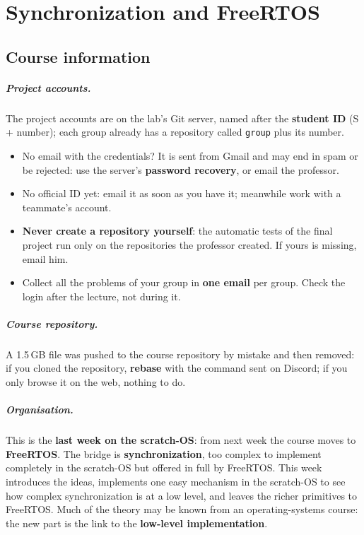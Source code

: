 \chapter{Synchronization and FreeRTOS}

\section{Course information}
\paragraph{Project accounts.} The project accounts are on the lab's Git server, named after the \textbf{student ID} (S + number); each group already has a repository called \texttt{group} plus its number.
\begin{itemize}
    \item No email with the credentials? It is sent from Gmail and may end in spam or be rejected: use the server's \textbf{password recovery}, or email the professor.
    \item No official ID yet: email it as soon as you have it; meanwhile work with a teammate's account.
    \item \textbf{Never create a repository yourself}: the automatic tests of the final project run only on the repositories the professor created. If yours is missing, email him.
    \item Collect all the problems of your group in \textbf{one email} per group. Check the login after the lecture, not during it.
\end{itemize}
\paragraph{Course repository.} A 1.5\,GB file was pushed to the course repository by mistake and then removed: if you cloned the repository, \textbf{rebase} with the command sent on Discord; if you only browse it on the web, nothing to do.

\paragraph{Organisation.} This is the \textbf{last week on the scratch-OS}: from next week the course moves to \textbf{FreeRTOS}. The bridge is \textbf{synchronization}, too complex to implement completely in the scratch-OS but offered in full by FreeRTOS. This week introduces the ideas, implements one easy mechanism in the scratch-OS to see how complex synchronization is at a low level, and leaves the richer primitives to FreeRTOS. Much of the theory may be known from an operating-systems course: the new part is the link to the \textbf{low-level implementation}.

